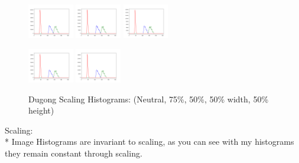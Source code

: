 \documentclass[conference]{IEEEtran}
\begin{document}
\begin{figure}[htbp]
    \centerline{
        {\includegraphics[width=20mm, scale=0.5]{./figures/ScalingHists/dugong.png}}
        {\includegraphics[width=20mm, scale=0.5]{./figures/ScalingHists/dugong75.png}}
        {\includegraphics[width=20mm, scale=0.5]{./figures/ScalingHists/dugong50.png}}
    }
    \centerline{
        {\includegraphics[width=20mm, scale=0.5]{./figures/ScalingHists/dugong50h.png}}
        {\includegraphics[width=20mm, scale=0.5]{./figures/ScalingHists/dugong50w.png}}
    }
    \caption{Dugong Scaling Histograms: (Neutral, 75\%, 50\%, 50\% width, 50\% height)}
    \label{fig}
\end{figure}
Scaling: \\*
Image Histograms are invariant to scaling, as you can see with my histograms they remain constant through scaling.
\end{document}

